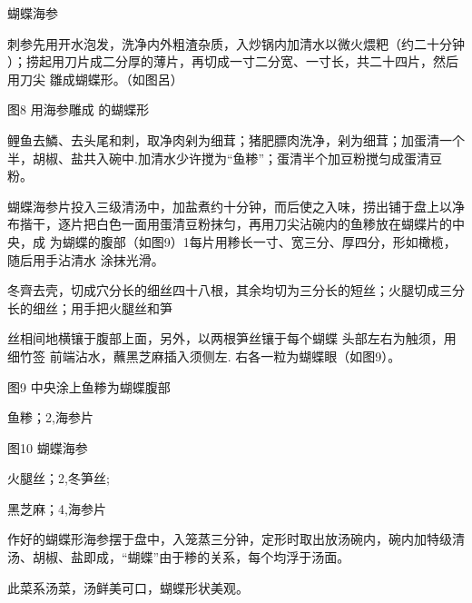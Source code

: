 \begin{recipe}{蝴蝶海参}

\ingredients


\preparation

\step 刺参先用开水泡发，洗净内外粗渣杂质，入炒锅内加清水以微火煨粑（约二十分钟
）；捞起用刀片成二分厚的薄片，再切成一寸二分宽、一寸长，共二十四片，然后用刀尖
雛成蝴蝶形。（如图呂）

图8 用海参雕成 的蝴蝶形

\step 鲤鱼去鱗、去头尾和刺，取净肉剁为细茸；猪肥膘肉洗净，剁为细茸；加蛋清一个
半，胡椒、盐共入碗中.加清水少许搅为“鱼糁”；蛋清半个加豆粉搅匀成蛋清豆粉。

\step 蝴蝶海参片投入三级清汤中，加盐煮约十分钟，而后使之入味，捞出铺于盘上以净
布揩干，逐片把白色一面用蛋清豆粉抹匀，再用刀尖沾碗内的鱼糁放在蝴蝶片的中央，成
为蝴蝶的腹部（如图9）1每片用糁长一寸、宽三分、厚四分，形如橄榄，随后用手沾清水
涂抹光滑。

\step 冬齊去壳，切成穴分长的细丝四十八根，其余均切为三分长的短丝；火腿切成三分
长的细丝；用手把火腿丝和笋

丝相间地横镶于腹部上面，另外，以两根笋丝镶于每个蝴蝶 头部左右为触须，用细竹签
前端沾水，蘸黑芝麻插入须侧左. 右各一粒为蝴蝶眼（如图9）。

图9 中央涂上鱼糁为蝴蝶腹部

\step 鱼糁；2,海参片

图10 蝴蝶海参

\step 火腿丝；2,冬笋丝;

\step 黑芝麻；4,海参片

\step 作好的蝴蝶形海参摆于盘中，入笼蒸三分钟，定形时取出放汤碗内，碗内加特级清
汤、胡椒、盐即成，“蝴蝶”由于糁的关系，每个均浮于汤面。

\features

此菜系汤菜，汤鲜美可口，蝴蝶形状美观。

\end{recipe}

